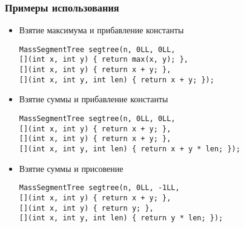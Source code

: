 \subsubsection{Примеры использования}
\begin{itemize}
  \item Взятие максимума и прибавление константы
\begin{lstlisting}
MassSegmentTree segtree(n, 0LL, 0LL,
[](int x, int y) { return max(x, y); },
[](int x, int y) { return x + y; },
[](int x, int y, int len) { return x + y; });
\end{lstlisting}

  \item Взятие суммы и прибавление константы
\begin{lstlisting}
MassSegmentTree segtree(n, 0LL, 0LL,
[](int x, int y) { return x + y; },
[](int x, int y) { return x + y; },
[](int x, int y, int len) { return x + y * len; });
\end{lstlisting}

\item Взятие суммы и присовение
\begin{lstlisting}
MassSegmentTree segtree(n, 0LL, -1LL,
[](int x, int y) { return x + y; },
[](int x, int y) { return y; },
[](int x, int y, int len) { return y * len; });
\end{lstlisting}
\end{itemize}
